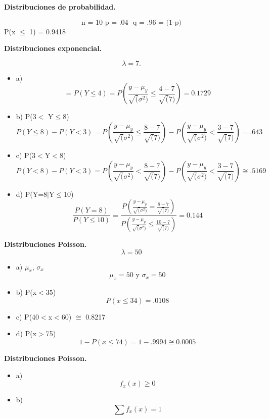 \documentclass{oxmathproblems}
\begin{document}
\begin{questions}

\miquestion\textbf {Distribuciones de probabilidad.}

$$ \text {n = 10 } 
\text {p = .04 }
\text { q = .96 = (1-p)} 
$$
P(x $\leq$ 1) = 0.9418

\miquestion\textbf{Distribuciones exponencial.}

$$ \lambda = 7. $$
 
 \begin{itemize}
\item  a) 
$$ 
 = P( Y \leq 4) = P( \frac{y- \mu_y}{\sqrt(\sigma^2)} \leq \frac{4-7}{\sqrt(7)}) 
 = 0.1729
$$
\item  b) P(3$<$ Y$\leq$8)
$$ P(Y \leq 8) - P(Y < 3)
=  P( \frac{y- \mu_y}{\sqrt(\sigma^2)} \leq \frac{8-7}{\sqrt(7)}) -  P( \frac{y- \mu_y}{\sqrt(\sigma^2)} < \frac{3-7}{\sqrt(7)}) = .643
$$

\item  c) P(3$<$Y$<$8)
$$ P(Y < 8) - P(Y < 3)
=  P( \frac{y- \mu_y}{\sqrt(\sigma^2)} < \frac{8-7}{\sqrt(7)}) -  P( \frac{y- \mu_y}{\sqrt(\sigma^2)} < \frac{3-7}{\sqrt(7)}) \cong .5169
$$ 
\item  d) P(Y=8$\mid$Y$\leq$10)
$$ \frac{P( Y=8)}{P( Y \leq 10)} =  \frac{P(\frac{y- \mu_y}{\sqrt(\sigma^2)} =  \frac{8-7}{\sqrt(7)})}{P( \frac{y- \mu_y}{\sqrt(\sigma^2)} \leq \frac{10-7}{\sqrt(7)})} = 0.144
$$
\end{itemize}

\miquestion\textbf{Distribuciones Poisson. }
$$ \lambda = 50 $$  
\begin{itemize}
\item a) $\mu_x$, $\sigma_x$
$$ \mu_x = 50 \text{ y } \sigma_x = 50 $$
\item  b) P(x$<$35)
$$ P(x \leq 34) = .0108 $$
\item  c) P(40$<$x$<$60) $\cong$ 0.8217

\item  d) P(x$>$75)
$$ 1- P( x \leq 74) = 1 - .9994 \cong 0.0005 $$ 
\end{itemize}

\miquestion\textbf{Distribuciones Poisson. }

\begin{itemize}
\item a) $$ f_x (x) \geq 0 $$ 
\item  b) $$ \sum f_x (x) = 1 $$
\end{itemize}


\end{questions}
\end{document}
